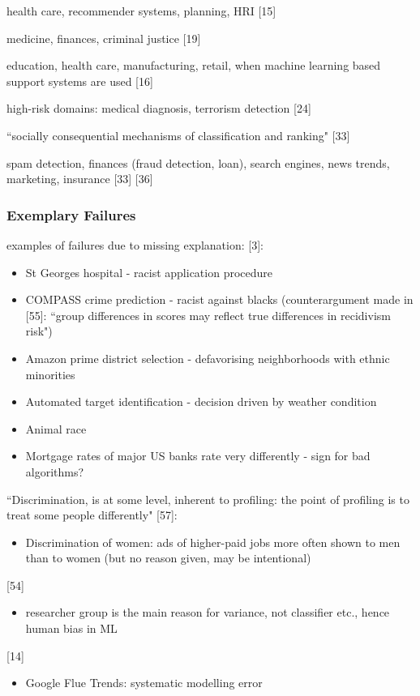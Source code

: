 health care, recommender systems, planning, HRI [15]\newline

medicine, finances, criminal justice [19] \newline

education, health care, manufacturing, retail, when machine learning based support systems are used [16] \newline

high-risk domains: medical diagnosis, terrorism detection [24] \newline

``socially consequential mechanisms of classification and ranking" [33] \newline

spam detection, finances (fraud detection, loan), search engines, news trends, marketing, insurance [33] [36] \newline

\subsubsection{Exemplary Failures}
examples of failures due to missing explanation:
[3]:
\begin{itemize}
	\item St Georges hospital - racist application procedure 
	\item COMPASS crime prediction - racist against blacks (counterargument made in [55]: ``group differences in scores may reflect true differences in recidivism risk")
	\item Amazon prime district selection - defavorising neighborhoods with ethnic minorities
	\item Automated target identification - decision driven by weather condition
	\item Animal race 
	\item Mortgage rates of major US banks rate very differently - sign for bad algorithms?
\end{itemize}
``Discrimination, is at some level, inherent to profiling: the point of profiling is to treat some people differently" [57]:
\begin{itemize}
	\item Discrimination of women: ads of higher-paid jobs more often shown to men than to women (but no reason given, may be intentional)
\end{itemize}
[54]
\begin{itemize}
	\item researcher group is the main reason for variance, not classifier etc., hence human bias in ML
\end{itemize}
[14]
\begin{itemize}
	\item Google Flue Trends: systematic modelling error 
\end{itemize}







